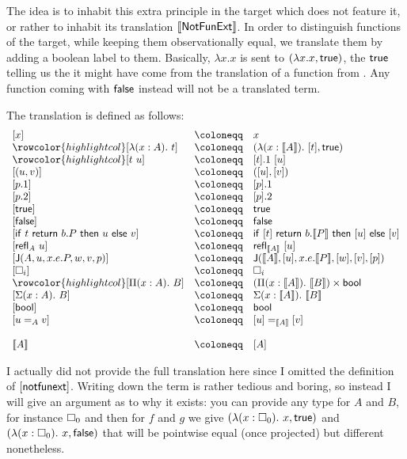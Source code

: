 The idea is to inhabit this extra principle in the target which does not feature
it, or rather to inhabit its translation \(\llbracket \mathsf{NotFunExt} \rrbracket\).
In order to distinguish functions of the target, while keeping them
observationally equal, we translate them by adding a boolean label to them.
Basically, \(\lambda x. x\) is sent to \((\lambda x. x, \mathsf{true})\), the
\(\mathsf{true}\) telling us the it might have come from the translation of a function
from \cS.
Any function coming with \(\mathsf{false}\) instead will not be a translated term.

The translation is defined as follows:
%
\[
\begin{array}{lcl}
  [ x ] &\coloneqq& x \\
  \rowcolor{highlightcol} \relax
  [ \lambda (x : A).\ t ] &\coloneqq& (\lambda (x : \transl{A}).\ [t],\ttrue) \\
  \rowcolor{highlightcol} \relax
  [ t\ u ] &\coloneqq& [t].1\ [u] \\ \relax
  [ (u, v) ] &\coloneqq& ([u], [v]) \\ \relax
  [ p.1 ] &\coloneqq& [p].1 \\ \relax
  [ p.2 ] &\coloneqq& [p].2 \\ \relax
  [ \ttrue ] &\coloneqq& \ttrue \\ \relax
  [ \ffalse ] &\coloneqq& \ffalse \\ \relax
  [ \tif{t}{b. P}{u}{v} ] &\coloneqq& \tif{[t]}{b. \transl{P}}{[u]}{[v]} \\
  \relax
  [ \refl{A} u ] &\coloneqq& \refl{\transl{A}} [u] \\ \relax
  [ \J{A}{u}{x.e.P}{w}{v}{p} ] &\coloneqq&
  \J{\transl{A}}{[u]}{x.e.\transl{P}}{[w]}{[v]}{[p]} \\ \relax
  [ \Ty{i} ] &\coloneqq& \Ty{i} \\
  \rowcolor{highlightcol} \relax
  [ \Pi (x : A).\ B ] &\coloneqq&
  (\Pi (x : \transl{A}).\ \transl{B}) \times \bool \\ \relax
  [ \Sigma (x : A).\ B ] &\coloneqq& \Sigma (x:\transl{A}).\ \transl{B} \\
  \relax
  [ \bool ] &\coloneqq& \bool \\ \relax
  [ u =_A v ] &\coloneqq& [u] =_{\transl{A}} [v] \\ \relax
  \\
  \transl{A} &\coloneqq& [A]
\end{array}
\]

I actually did not provide the full translation here since I omitted
the definition of \([\mathsf{notfunext}]\).
Writing down the term is rather tedious and boring, so instead I will give an
argument as to why it exists: you can provide any type for \(A\) and \(B\), for
instance \(\square_{0}\) and then for \(f\) and \(g\) we give
\((\lambda (x:\square_{0}).\ x, \mathsf{true})\) and
\((\lambda (x:\square_{0}).\ x, \mathsf{false})\) that will be pointwise equal (once
projected) but different nonetheless.

